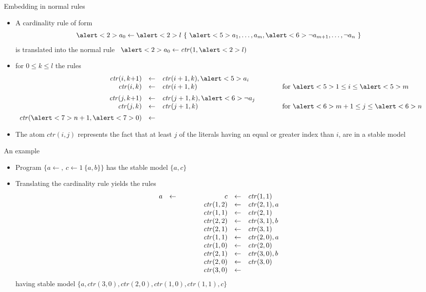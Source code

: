 \begin{frame}{Embedding in normal rules}
\begin{itemize}
\item A cardinality rule of form
\[
\alert<2>{a_0}\leftarrow\alert<2>{l}~\{\ \alert<5>{a_1,\dots,a_m},\alert<6>{\neg a_{m+1},\dots,\neg a_n}\ \}
\]
is translated into the normal rule \
\(
\alert<2>{a_0}\leftarrow \mathit{ctr}(1,\alert<2>{l})
\)
\ \uncover<4->{and}
\item<only@4-> [] for $0\leq k\leq l$ the rules
\[
\begin{array}{rclp{20pt}l}
\mathit{ctr}(i, k{+}1)&\leftarrow&\mathit{ctr}({i+1}, k),\alert<5>{a_i}
&&\\
\mathit{ctr}(i, k)&\leftarrow&\mathit{ctr}({i+1}, k)
&&\text{for }\alert<5>{1}\leq i\leq \alert<5>{m}
\\[5pt]
\mathit{ctr}(j, k{+}1)&\leftarrow&\mathit{ctr}({j+1}, k),\alert<6>{\neg a_j}
\\
\mathit{ctr}(j, k)&\leftarrow&\mathit{ctr}({j+1}, k)
&&\text{for }\alert<6>{m+1}\leq j\leq \alert<6>{n}
\\[5pt]
\mathit{ctr}(\alert<7>{n+1}, \alert<7>{0})&\leftarrow&
&&
\end{array}
\]
\item<3->
The atom $\mathit{ctr}(i,j)$ represents the fact that at least $j$ of the
literals having an equal or greater index than $i$, are in a stable model
\end{itemize}
\end{frame}
\begin{frame}{An example}
\begin{itemize}
\item Program
  \(
  \{  a\leftarrow,\ c\leftarrow 1~\{a,b\}  \}
  \)
  has the stable model $\{a,c\}$
\item<2-> Translating the cardinality rule yields the rules
\[
\begin{array}[t]{rcl}
a&\leftarrow&
\end{array}
\qquad
\begin{array}[t]{rcl}
c&\leftarrow& \mathit{ctr}(1,1)
\\
\mathit{ctr}(1, 2)&\leftarrow&\mathit{ctr}(2, 1),a
\\
\mathit{ctr}(1, 1)&\leftarrow&\mathit{ctr}(2, 1)
\\
\mathit{ctr}(2, 2)&\leftarrow&\mathit{ctr}(3, 1),b
\\
\mathit{ctr}(2, 1)&\leftarrow&\mathit{ctr}(3, 1)
\\
\mathit{ctr}(1, 1)&\leftarrow&\mathit{ctr}(2, 0),a
\\
\mathit{ctr}(1, 0)&\leftarrow&\mathit{ctr}(2, 0)
\\
\mathit{ctr}(2, 1)&\leftarrow&\mathit{ctr}(3, 0),b
\\
\mathit{ctr}(2, 0)&\leftarrow&\mathit{ctr}(3, 0)
\\
\mathit{ctr}(3, 0)&\leftarrow&
\end{array}
\]
having stable model
\(
\{
a,
\mathit{ctr}(3, 0),
\mathit{ctr}(2, 0),
\mathit{ctr}(1, 0),
\mathit{ctr}(1, 1),
c
\}
\)
\end{itemize}
\end{frame}
